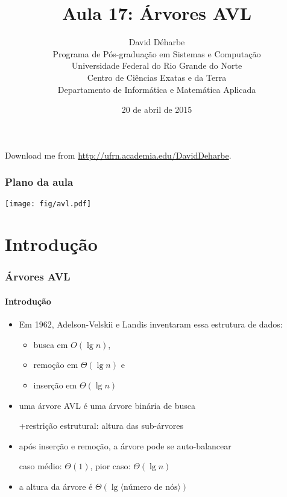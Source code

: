 \documentclass{beamer}
\title{Aula 17: Árvores AVL}
\author{David Déharbe \\
  Programa de Pós-graduação em Sistemas e Computação \\
  Universidade Federal do Rio Grande do Norte \\
  Centro de Ciências Exatas e da Terra \\
  Departamento de Informática e Matemática Aplicada}
\date{20 de abril de 2015}
\begin{document}
\begin{frame}
  \titlepage
  Download me from \url{http://ufrn.academia.edu/DavidDeharbe}.
\end{frame}

\begin{frame}
  \frametitle{Plano da aula}


  \begin{center}
    \texttt{[image: fig/avl.pdf]}
  \end{center}

  \tableofcontents

\end{frame}

\section{Introdução}

\begin{frame}

  \frametitle{Árvores AVL}
  \framesubtitle{Introdução}

  
  \begin{itemize}
    
  \item Em 1962, Adelson-Velskii e Landis inventaram essa estrutura de dados:
    \begin{itemize}
    \item busca em $O(\lg n)$, 
    \item remoção em $\Theta(\lg n)$ e
    \item inserção em $\Theta(\lg n)$
    \end{itemize}

  \item uma \alert{árvore AVL} é uma árvore binária de busca 

  +restrição estrutural: altura das sub-árvores

  \item após inserção e remoção, a árvore pode se auto-balancear 

    caso médio: $\Theta(1)$, pior caso: $\Theta(\lg n)$
    
  \item a altura da árvore é $\Theta(\lg \langle \text{número de nós} \rangle)$

  \end{itemize}

\end{frame}
\end{document}

